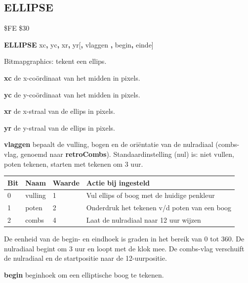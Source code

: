 
\newpage
\subsection{ELLIPSE}
\begin{description}[leftmargin=2cm,style=nextline]
\item [Token:]    \$FE \$30

\item [Formaat:]   {\bf ELLIPSE} xc{\bf,} yc{\bf,} xr{\bf,} yr[{\bf,} vlaggen {\bf,} begin{\bf,} einde]

\item [Gebruik:]    Bitmapgraphics: tekent een ellips.

                  {\bf xc} de x-coördinaat van het midden in pixels.

                  {\bf yc} de y-coördinaat van het midden in pixels.

{\bf xr} de x-straal van de ellips in pixels.

{\bf yr} de y-straal van de ellips in pixels.

                  {\bf vlaggen} bepaalt de vulling, bogen en de oriëntatie van de nulradiaal (combs-vlag, genoemd naar {\bf retroCombs}). Standaardinstelling (nul) is: niet vullen, poten tekenen, starten met tekenen om 3 uur.

                  {\small\setlength{\tabcolsep}{1.5mm}
                  \begin{tabular}{|l|l|l|l|}
                  \hline
                  {\bf Bit}  & {\bf Naam} & {\bf Waarde} & {\bf Actie bij ingesteld} \\
                  \hline
                  0 & vulling  & 1  & Vul ellips of boog met de huidige penkleur \\                1 & poten  & 2  & Onderdruk het tekenen v/d poten van een boog \\                  2 & combs & 4  & Laat de nulradiaal naar 12 uur wijzen \\
                  \hline
                  \end{tabular}
                  }

                  De eenheid van de begin- en eindhoek is graden in het bereik van 0 tot 360. De nulradiaal begint om 3 uur en loopt met de klok mee. De combs-vlag verschuift de nulradiaal en de startpositie naar de 12-uurpositie.

                  {\bf begin} beginhoek om een elliptische boog te tekenen.


\end{description}
